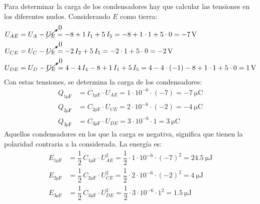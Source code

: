 Para determinar la carga de los condensadores hay que calcular las
tensiones en los diferentes nudos. Considerando $E$ como tierra:
\begin{align*}
  U_{AE}&=U_{A}-\cancelto{0}{U_{E}}=-8+1\,I_1+5\,I_5=-8+1\cdot 1 + 5\cdot 0=\qty{-7}{\volt}\\
  U_{CE}&=U_{C}-\cancelto{0}{U_{E}}=-2\,I_2+5\,I_5=-2\cdot 1+5\cdot 0 =\qty{-2}{\volt}\\
  U_{DE}&=U_{D}-\cancelto{0}{U_{E}}=4-4\, I_4-8+1\,I_1+5\,I_5=4-4\cdot (-1)-8+1\cdot 1 +5\cdot 0=\qty{1}{\volt}
\end{align*}
Con estas tensiones, se determina la carga de los condensadores:
\begin{align*}
  Q_{1\si{\micro\farad}} &= C_{1\si{\micro\farad}} \cdot U_{AE} = 1\cdot 10^{-6}\cdot (-7)=\qty{-7}{\micro\coulomb}\\
  Q_{2\si{\micro\farad}} &= C_{2\si{\micro\farad}} \cdot U_{CE} = 2\cdot 10^{-6}\cdot (-2)=\qty{-4}{\micro\coulomb}\\
  Q_{3\si{\micro\farad}} &= C_{3\si{\micro\farad}} \cdot U_{DE} = 3\cdot 10^{-6}\cdot 1=\qty{3}{\micro\coulomb}
\end{align*}
Aquellos condensadores en los que la carga es negativa, significa que
tienen la polaridad contraria a la considerada. La energía es:
\begin{align*}
  E_{1\si{\micro\farad}}&=\dfrac{1}{2}\,C_{1\si{\micro\farad}}\cdot U_{AE}^2 = \dfrac{1}{2}\cdot 1\cdot 10^{-6}\cdot (-7)^2 = \qty{24.5}{\micro\joule}\\
  E_{2\si{\micro\farad}}&=\dfrac{1}{2}\,C_{2\si{\micro\farad}}\cdot U_{CE}^2 = \dfrac{1}{2}\cdot 2\cdot 10^{-6}\cdot (-2)^2 = \qty{4}{\micro\joule}\\
  E_{3\si{\micro\farad}}&=\dfrac{1}{2}\,C_{3\si{\micro\farad}}\cdot U_{DE}^2 = \dfrac{1}{2}\cdot 3\cdot 10^{-6}\cdot 1^2 = \qty{1.5}{\micro\joule}
\end{align*}

